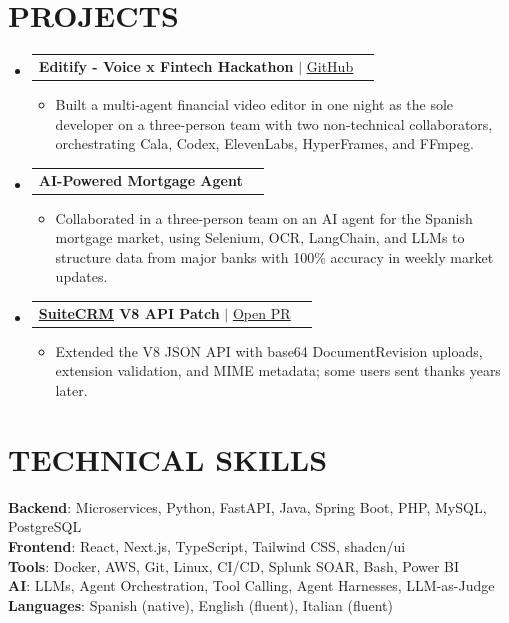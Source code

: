 \documentclass[letterpaper,11pt]{article}
\makeatletter
\newcommand{\resumeItem}[1]{
  \item\small{
    {#1 \vspace{-2pt}}
  }
}
\newcommand{\resumeProjectHeading}[2]{
  \item
    \begin{tabular*}{0.97\textwidth}{l@{\extracolsep{\fill}}r}
      \small#1 & #2 \\
    \end{tabular*}\vspace{-7pt}
}
\newcommand{\resumeSubHeadingListStart}{\begin{itemize}[leftmargin=0.15in, label={}]}
\newcommand{\resumeSubHeadingListEnd}{\end{itemize}}
\newcommand{\resumeItemListStart}{\begin{itemize}}
\newcommand{\resumeItemListEnd}{\end{itemize}\vspace{-5pt}}
\makeatother
\begin{document}
\section{PROJECTS}
  \resumeSubHeadingListStart
    \resumeProjectHeading
      {\textbf{Editify - Voice x Fintech Hackathon} $|$ \href{https://github.com/vercinbleach/hackaton-cala-voice-of-finance}{\underline{GitHub}}}{}
      \resumeItemListStart
        \resumeItem{Built a multi-agent financial video editor in one night as the sole developer on a three-person team with two non-technical collaborators, orchestrating Cala, Codex, ElevenLabs, HyperFrames, and FFmpeg.}
      \resumeItemListEnd
    \resumeProjectHeading
      {\textbf{AI-Powered Mortgage Agent}}{}
      \resumeItemListStart
        \resumeItem{Collaborated in a three-person team on an AI agent for the Spanish mortgage market, using Selenium, OCR, LangChain, and LLMs to structure data from major banks with 100\% accuracy in weekly market updates.}
      \resumeItemListEnd
    \resumeProjectHeading
      {\textbf{\href{https://github.com/SuiteCRM/SuiteCRM}{\underline{SuiteCRM}} V8 API Patch} $|$ \href{https://github.com/SuiteCRM/SuiteCRM/pull/10766}{\underline{Open PR}}}{}
      \resumeItemListStart
        \resumeItem{Extended the V8 JSON API with base64 DocumentRevision uploads, extension validation, and MIME metadata; some users sent thanks years later.}
      \resumeItemListEnd
  \resumeSubHeadingListEnd

\section{TECHNICAL SKILLS}
  \begin{itemize}[leftmargin=0.15in, label={}]
    \small{\item{
      \textbf{Backend}{: Microservices, Python, FastAPI, Java, Spring Boot, PHP, MySQL, PostgreSQL} \\
      \textbf{Frontend}{: React, Next.js, TypeScript, Tailwind CSS, shadcn/ui} \\
      \textbf{Tools}{: Docker, AWS, Git, Linux, CI/CD, Splunk SOAR, Bash, Power BI} \\
      \textbf{AI}{: LLMs, Agent Orchestration, Tool Calling, Agent Harnesses, LLM-as-Judge} \\
      \textbf{Languages}{: Spanish (native), English (fluent), Italian (fluent)}
    }}
  \end{itemize}
\end{document}
